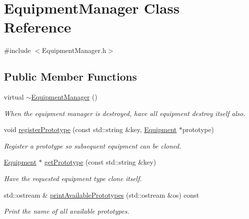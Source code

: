 \hypertarget{class_equipment_manager}{}\section{Equipment\+Manager Class Reference}
\label{class_equipment_manager}


{\ttfamily \#include $<$Equipment\+Manager.\+h$>$}

\subsection*{Public Member Functions}
\begin{DoxyCompactItemize}
\item 
\hypertarget{class_equipment_manager_af46a4c47fdf8c30b9f57289b26ce1bb7}{}virtual \hyperlink{class_equipment_manager_af46a4c47fdf8c30b9f57289b26ce1bb7}{$\sim$\+Equipment\+Manager} ()\label{class_equipment_manager_af46a4c47fdf8c30b9f57289b26ce1bb7}

\begin{DoxyCompactList}\small\item\em When the equipment manager is destroyed, have all equipment destroy itself also. \end{DoxyCompactList}\item 
\hypertarget{class_equipment_manager_a9b0b1f9a7bfd3a2f6f175861934d5209}{}void \hyperlink{class_equipment_manager_a9b0b1f9a7bfd3a2f6f175861934d5209}{register\+Prototype} (const std\+::string \&key, \hyperlink{class_equipment}{Equipment} $\ast$prototype)\label{class_equipment_manager_a9b0b1f9a7bfd3a2f6f175861934d5209}

\begin{DoxyCompactList}\small\item\em Register a prototype so subsequent equipment can be cloned. \end{DoxyCompactList}\item 
\hypertarget{class_equipment_manager_a5fa1699c3d15509e0919398ae26996b9}{}\hyperlink{class_equipment}{Equipment} $\ast$ \hyperlink{class_equipment_manager_a5fa1699c3d15509e0919398ae26996b9}{get\+Prototype} (const std\+::string \&key)\label{class_equipment_manager_a5fa1699c3d15509e0919398ae26996b9}

\begin{DoxyCompactList}\small\item\em Have the requested equipment type clone itself. \end{DoxyCompactList}\item 
\hypertarget{class_equipment_manager_ac3a359204e3460e07f241599e888f9fa}{}std\+::ostream \& \hyperlink{class_equipment_manager_ac3a359204e3460e07f241599e888f9fa}{print\+Available\+Prototypes} (std\+::ostream \&os) const \label{class_equipment_manager_ac3a359204e3460e07f241599e888f9fa}

\begin{DoxyCompactList}\small\item\em Print the name of all available prototypes. \end{DoxyCompactList}\end{DoxyCompactItemize}


